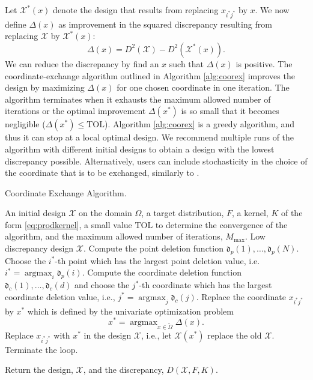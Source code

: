 \documentclass[graybox]{svmult}
\DeclareMathOperator*{\argmax}{argmax}
\newcommand{\Xdes}{\mathcal{X}}
\newcommand{\frakd}{\mathfrak{d}}
\newcommand{\tOmega}{\widetilde{\Omega}}
\newcommand{\TOL}{\text{TOL}}
\begin{document}
Let $\Xdes^*(x)$ denote the design that results from replacing $x_{i^*j^*}$ by $x$. 
We now define $\Delta(x)$ as improvement in the squared discrepancy resulting from replacing $\Xdes$ by $\Xdes^*(x)$:
\begin{equation}\label{eq:deltafun}
\Delta(x) = D^2(\Xdes)-D^2(\Xdes^*(x)).
\end{equation}
We can reduce the discrepancy by find an $x$ such that $\Delta(x)$ is positive. 
The coordinate-exchange algorithm outlined in Algorithm \ref{alg:coorex} improves the design by maximizing $\Delta(x)$ for one chosen coordinate in one iteration. 
The algorithm terminates when it exhausts the maximum allowed number of iterations or the optimal improvement $\Delta(x^*)$ is so small that it becomes negligible ($\Delta(x^*)\leq \textrm{TOL}$). 
Algorithm \ref{alg:coorex} is a greedy algorithm, and thus it can stop at a local optimal design. 
We recommend multiple runs of the algorithm with different initial designs to obtain a design with the lowest discrepancy possible. 
Alternatively, users can include stochasticity in the choice of the coordinate that is to be exchanged, similarly to \cite{kang2018stochastic}. 

\begin{algorithm}[ht]
\caption{Coordinate Exchange Algorithm.\label{alg:coorex}}
\begin{algorithmic}[1]
\INPUT An initial design $\Xdes$ on the domain $\Omega$, a target distribution, $F$, a kernel, $K$ of the form \eqref{eq:prodkernel}, a small value $\TOL$ to determine the convergence of the algorithm, and the maximum allowed number of iterations, $M_{\max}$.
\OUTPUT Low discrepancy design $\Xdes$. 
\State Compute the point deletion function $\frakd_p(1), \ldots, \frakd_p(N)$. Choose the $i^*$-th point which has the largest point deletion value, i.e. $i^* = \argmax_{i} \frakd_p(i)$. 
\State Compute the coordinate deletion function $\frakd_c(1), \ldots, \frakd_c(d)$ and choose the $j^*$-th coordinate which has the largest coordinate deletion value, i.e., $j^* = \argmax_{j} \frakd_c(j)$. 
\State Replace the coordinate $x_{i^*j^*}$ by $x^*$ which is defined by the univariate optimization problem
\[
x^* = \argmax_{x \in \tOmega} \Delta(x).
\]
\If{$\Delta(x^*)>\TOL$} 
\State Replace $x_{i^*j^*}$ with $x^*$ in the design $\Xdes$, i.e., let  $\Xdes(x^*)$ replace the old $\Xdes$.
\Else 
\State Terminate the loop.

\EndIf
\EndFor
\State Return the design, $\Xdes$, and the discrepancy, $D(\Xdes,F,K)$.
\end{algorithmic}
\end{algorithm}
\end{document}

